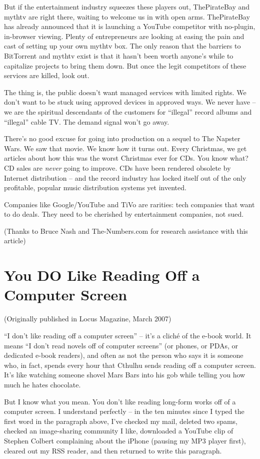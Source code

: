 But if the entertainment industry squeezes these players out,
ThePirateBay and mythtv are right there, waiting to welcome us in
with open arms. ThePirateBay has already announced that it is
launching a YouTube competitor with no-plugin, in-browser viewing.
Plenty of entrepreneurs are looking at easing the pain and cast of
setting up your own mythtv box. The only reason that the barriers
to BitTorrent and mythtv exist is that it hasn't been worth
anyone's while to capitalize projects to bring them down. But once
the legit competitors of these services are killed, look out.

The thing is, the public doesn't want managed services with limited
rights. We don't want to be stuck using approved devices in
approved ways. We never have -- we are the spiritual descendants of
the customers for ``illegal'' record albums and ``illegal'' cable TV.
The demand signal won't go away.

There's no good excuse for going into production on a sequel to The
Napster Wars. We saw that movie. We know how it turns out. Every
Christmas, we get articles about how this was the worst Christmas
ever for CDs. You know what? CD sales are \emph{never} going to
improve. CDs have been rendered obsolete by Internet distribution
-- and the record industry has locked itself out of the only
profitable, popular music distribution systems yet invented.

Companies like Google/YouTube and TiVo are rarities: tech companies
that want to do deals. They need to be cherished by entertainment
companies, not sued.

(Thanks to Bruce Nash and The-Numbers.com for research assistance
with this article)

\section{You DO Like Reading Off a Computer Screen}

(Originally published in Locus Magazine, March 2007)

``I don't like reading off a computer screen'' -- it's a cliché of
the e-book world. It means ``I don't read novels off of computer
screens'' (or phones, or PDAs, or dedicated e-book readers), and
often as not the person who says it is someone who, in fact, spends
every hour that Cthulhu sends reading off a computer screen. It's
like watching someone shovel Mars Bars into his gob while telling
you how much he hates chocolate.

But I know what you mean. You don't like reading long-form works
off of a computer screen. I understand perfectly -- in the ten
minutes since I typed the first word in the paragraph above, I've
checked my mail, deleted two spams, checked an image-sharing
community I like, downloaded a YouTube clip of Stephen Colbert
complaining about the iPhone (pausing my MP3 player first), cleared
out my RSS reader, and then returned to write this paragraph.

